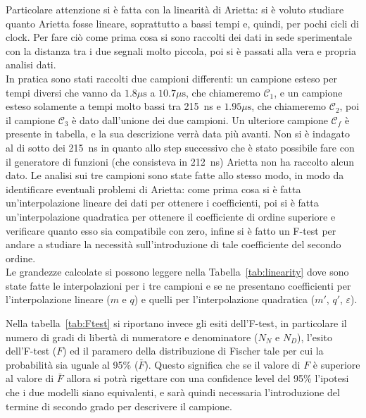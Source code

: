 Particolare attenzione si è fatta con la linearità di Arietta: si è voluto studiare quanto Arietta fosse lineare, soprattutto a bassi tempi e, quindi, per pochi cicli di clock. Per fare ciò come prima cosa si sono raccolti dei dati in sede sperimentale con la distanza tra i due segnali molto piccola, poi si è passati alla vera e propria analisi dati.\\

In pratica sono stati raccolti due campioni differenti: un campione esteso per tempi diversi che vanno da $1.8 \mu\text{s}$ a $10.7 \mu\text{s}$, che chiameremo $\mathcal{C}_1$, e un campione esteso solamente a tempi molto bassi tra 215~ns e $1.95\mu\text{s}$, che chiameremo $\mathcal{C}_2$, poi il campione $\mathcal{C}_3$ è dato dall'unione dei due campioni. Un ulteriore campione $\mathcal{C}_f$ è presente in tabella, e la sua descrizione verrà data più avanti. Non si è indagato al di sotto dei 215~ns in quanto allo step successivo che è stato possibile fare con il generatore di funzioni (che consisteva in 212~ns) Arietta non ha raccolto alcun dato. Le analisi sui tre campioni sono state fatte allo stesso modo, in modo da identificare eventuali problemi di Arietta: come prima cosa si è fatta un'interpolazione lineare dei dati per ottenere i coefficienti, poi si è fatta un'interpolazione quadratica per ottenere il coefficiente di ordine superiore e verificare quanto esso sia compatibile con zero, infine si è fatto un F-test per andare a studiare la necessità sull'introduzione di tale coefficiente del secondo ordine.\\

Le grandezze calcolate si possono leggere nella Tabella~\ref{tab:linearity} dove sono state fatte le interpolazioni per i tre campioni e se ne presentano coefficienti per l'interpolazione lineare ($m$ e $q$) e quelli per l'interpolazione quadratica ($m'$, $q'$, $\varepsilon$).\\

Nella tabella~\ref{tab:Ftest} si riportano invece gli esiti dell'F-test, in particolare il numero di gradi di libertà di numeratore e denominatore ($N_N$ e $N_D$), l'esito dell'F-test ($F$) ed il paramero della distribuzione di Fischer tale per cui la probabilità sia uguale al 95\% ($\bar{F}$). Questo  significa che se il valore di $F$ è superiore al valore di $\bar{F}$ allora si potrà rigettare con una confidence level del 95\% l'ipotesi che i due modelli siano equivalenti, e  sarà quindi necessaria l'introduzione del termine di secondo grado per descrivere il campione.\\

